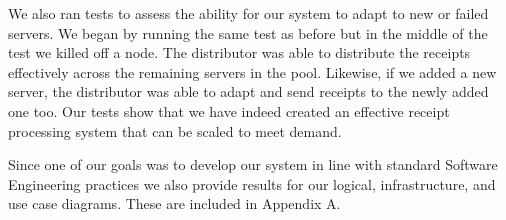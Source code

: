 We also ran tests to assess the ability for our system to adapt to new
or failed servers. We began by running the same test as before but in
the middle of the test we killed off a node. The distributor was able
to distribute the receipts effectively across the remaining servers in
the pool. Likewise, if we added a new server, the distributor was able
to adapt and send receipts to the newly added one too. Our tests show
that we have indeed created an effective receipt processing system
that can be scaled to meet demand.

Since one of our goals was to develop our system in line with standard
Software Engineering practices we also provide results for our logical,
infrastructure, and use case diagrams. These are included in Appendix
A.
